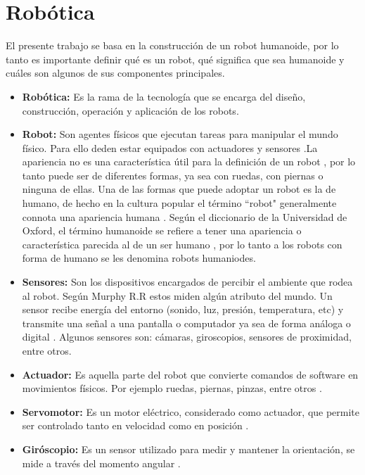\section{Robótica} \label{sect:robotica}
 
El presente trabajo se basa en la construcción de un robot humanoide, por lo tanto es importante definir qué es un robot, qué significa que sea humanoide y cuáles son algunos de sus componentes principales.

\begin{itemize}
\item{\textbf{Robótica:} Es la rama de la tecnología que se encarga del diseño, construcción, operación y aplicación de los robots. \cite{oxfordRobotics}}

\item{\textbf{Robot:} Son agentes físicos que ejecutan tareas para manipular el mundo físico. Para ello deden estar equipados con actuadores y sensores \cite{peterAndNorvig}.La apariencia no es una característica útil para la definición de un robot \cite{AiRobotics}, por lo tanto puede ser de diferentes formas, ya sea con ruedas, con piernas o ninguna de ellas. Una de las formas que puede adoptar un robot es la de humano, de hecho en la cultura popular el término ``robot" generalmente connota una apariencia humana \cite{AiRobotics}. Según el diccionario de la Universidad de Oxford,  el término humanoide se refiere a tener una apariencia o característica parecida al de un ser humano \cite{oxfordRobotics}, por lo tanto a los robots con forma de humano se les denomina robots humaniodes.}    

\item{\textbf{Sensores:}  Son los dispositivos encargados de percibir el ambiente que rodea al robot. Según Murphy R.R estos miden algún atributo del mundo. Un sensor recibe energía del entorno (sonido, luz, presión, temperatura, etc) y transmite una señal a una pantalla o computador ya sea de forma análoga o digital \cite{AiRobotics}. Algunos sensores son: cámaras, giroscopios, sensores de proximidad, entre otros.}

\item{\textbf{Actuador:}  Es aquella parte del robot que convierte comandos de software en movimientos físicos. Por ejemplo ruedas, piernas, pinzas, entre otros \cite{peterNorvig}.}

\item{\textbf{Servomotor:}  Es un motor eléctrico, considerado como actuador, que permite ser controlado tanto en velocidad como en posición \cite{AiRobotics}. }


\item{\textbf{Giróscopio:} Es un sensor utilizado para medir y mantener la orientación, se mide a través del momento angular \cite{gyro1}. }
\end{itemize}

